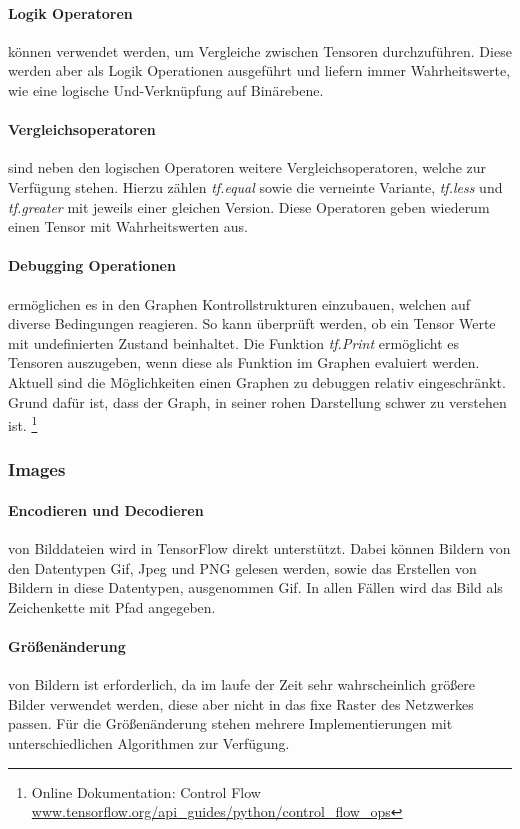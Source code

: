 \paragraph{Logik Operatoren} können verwendet werden, um Vergleiche zwischen Tensoren durchzuführen. 
Diese werden aber als Logik Operationen ausgeführt und liefern immer Wahrheitswerte, wie eine logische Und-Verknüpfung auf Binärebene.

\paragraph{Vergleichsoperatoren} sind neben den logischen Operatoren weitere Vergleichsoperatoren, welche zur Verfügung stehen. 
Hierzu zählen \textit{tf.equal} sowie die verneinte Variante, \textit{tf.less} und \textit{tf.greater} mit jeweils einer gleichen Version. 
Diese Operatoren geben wiederum einen Tensor mit Wahrheitswerten aus.

\paragraph{Debugging Operationen} ermöglichen es in den Graphen Kontrollstrukturen einzubauen, welchen auf diverse Bedingungen reagieren.
So kann überprüft werden, ob ein Tensor Werte mit undefinierten Zustand beinhaltet. 
Die Funktion \textit{tf.Print} ermöglicht es Tensoren auszugeben, wenn diese als Funktion im Graphen evaluiert werden. 
Aktuell sind die Möglichkeiten einen Graphen zu debuggen relativ eingeschränkt. 
Grund dafür ist, dass der Graph, in seiner rohen Darstellung schwer zu verstehen ist. \footnote{Online Dokumentation: Control Flow \url{www.tensorflow.org/api_guides/python/control_flow_ops}}

\subsubsection{Images}

\paragraph{Encodieren und Decodieren} von Bilddateien wird in TensorFlow direkt unterstützt.
Dabei können Bildern von den Datentypen Gif, Jpeg und PNG gelesen werden, sowie das Erstellen von Bildern in diese Datentypen, ausgenommen Gif.
In allen Fällen wird das Bild als Zeichenkette mit Pfad angegeben. 

\paragraph{Größenänderung} von Bildern ist erforderlich, da im laufe der Zeit sehr wahrscheinlich größere Bilder verwendet werden, diese aber nicht in das fixe Raster des Netzwerkes passen. 
Für die Größenänderung stehen mehrere Implementierungen mit unterschiedlichen Algorithmen zur Verfügung.


